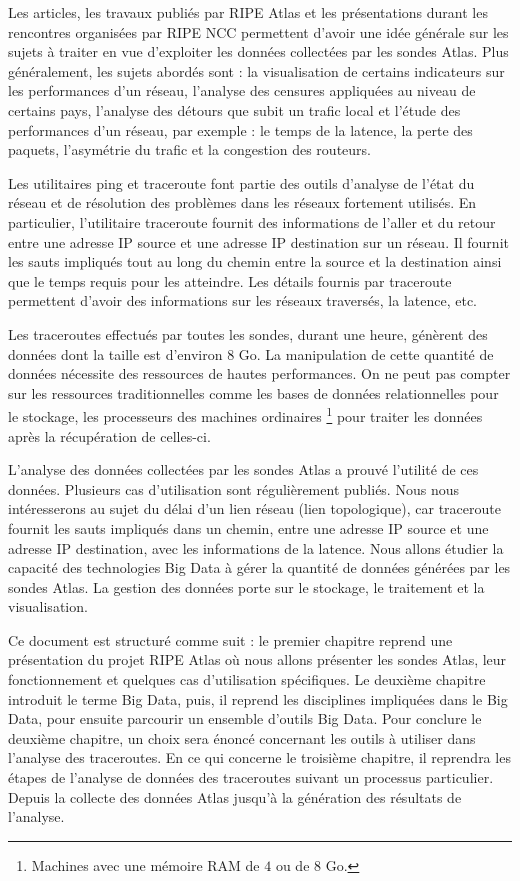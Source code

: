 Les articles, les travaux publiés par RIPE Atlas et les présentations durant les rencontres organisées par RIPE NCC permettent d'avoir une idée générale sur les sujets à traiter en vue d'exploiter les données collectées par les sondes Atlas. Plus généralement,  les sujets abordés sont : la visualisation de certains indicateurs sur les performances d'un réseau, l'analyse des censures appliquées au niveau de certains pays, l'analyse des détours que subit un trafic local et l'étude des performances d'un réseau, par exemple :  le temps de la latence, la perte des paquets, l'asymétrie du trafic et la congestion des routeurs.




Les utilitaires ping et traceroute font partie des outils d'analyse de l'état du réseau et de résolution des problèmes dans les réseaux fortement utilisés. En particulier, l'utilitaire traceroute fournit des informations de l'aller et du retour entre une adresse IP source et une adresse IP destination sur un réseau. Il fournit les sauts impliqués tout au long du chemin entre la  source et la destination  ainsi que le temps requis pour les atteindre. Les détails fournis par traceroute permettent d'avoir des informations sur les réseaux traversés, la latence, etc.


Les traceroutes effectués par toutes les sondes, durant une heure, génèrent des données dont la taille est d'environ $ 8 $ Go. La manipulation de cette quantité de données nécessite des ressources de hautes performances. On ne peut pas compter sur   les ressources traditionnelles comme les bases de données relationnelles pour le stockage, les processeurs des  machines ordinaires \footnote{Machines avec une mémoire RAM de $ 4 $ ou de $ 8 $ Go.} pour traiter les données  après la récupération de celles-ci.

L'analyse des données collectées par les sondes Atlas a prouvé l'utilité de ces données. Plusieurs cas d'utilisation sont régulièrement publiés. Nous nous intéresserons au sujet du délai d'un lien réseau (lien topologique), car traceroute fournit les sauts impliqués dans un chemin, entre une adresse IP source et une adresse IP destination, avec les informations de la latence. Nous allons étudier la capacité des technologies Big Data à gérer la quantité de données générées par les sondes Atlas. La gestion des données porte sur le stockage, le traitement et la visualisation.



Ce document est structuré comme suit : le premier chapitre reprend une présentation du projet RIPE Atlas où nous allons présenter les sondes Atlas, leur fonctionnement  et quelques cas d'utilisation spécifiques. Le deuxième chapitre introduit  le terme  Big Data, puis, il reprend les disciplines impliquées dans le Big Data, pour ensuite parcourir un ensemble d'outils Big Data. Pour conclure le deuxième chapitre, un choix sera énoncé concernant les outils à utiliser dans l'analyse des traceroutes. 
En ce qui concerne le troisième chapitre, il reprendra les étapes de l'analyse de données des traceroutes suivant un processus particulier. Depuis la collecte des données Atlas jusqu'à la génération des résultats de l'analyse. 